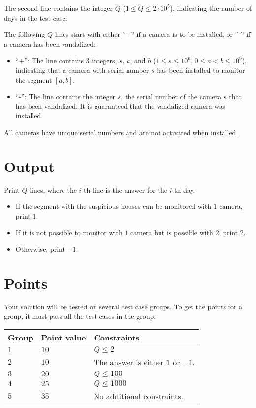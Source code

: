 The second line contains the integer $Q$ ($1 \le Q \le 2 \cdot 10^5$), 
indicating the number of days in the test case.

The following $Q$ lines start with either ``+'' if a camera is to be installed, or ``-'' if a camera has been vandalized:
\begin{itemize}
  \item ``+'': The line contains $3$ integers, $s$, $a$, and $b$ ($1\le s \le 10^6$, $0\le a < b \le 10^9$), 
  indicating that a camera with serial number $s$ has been installed to monitor the segment $[a,b]$.
  \item ``-'': The line contains the integer $s$, the serial number of the camera $s$ that has been vandalized.
  It is guaranteed that the vandalized camera was installed.
\end{itemize}

All cameras have unique serial numbers and are not activated when installed.

\section*{Output}
Print $Q$ lines, where the $i$-th line is the answer for the $i$-th day.
\begin{itemize}
  \item If the segment with the suspicious houses can be monitored with $1$ camera, print $1$.
  \item If it is not possible to monitor with $1$ camera but is possible with $2$, print $2$.
  \item Otherwise, print $-1$.
\end{itemize}


\section*{Points}
Your solution will be tested on several test case groups.
To get the points for a group, it must pass all the test cases in the group.

\noindent
\begin{tabular}{| l | l | p{12cm} |}
  \hline
  \textbf{Group} & \textbf{Point value} & \textbf{Constraints} \\ \hline
  $1$    & $10$       & $Q \le 2$ \\ \hline
  $2$    & $10$       & The answer is either $1$ or $-1$. \\ \hline
  $3$    & $20$       & $Q \le 100$ \\ \hline
  $4$    & $25$       & $Q \le 1000$ \\ \hline
  $5$    & $35$       & No additional constraints. \\ \hline
\end{tabular}

